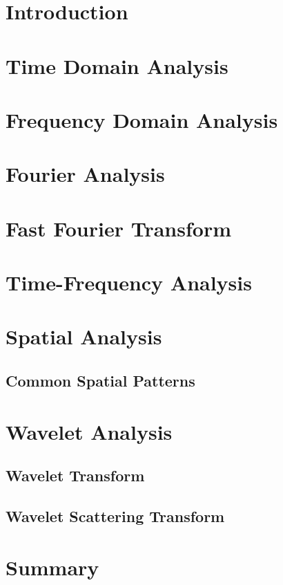 \section*{Introduction}

\section{Time Domain Analysis}

\section{Frequency Domain Analysis}

\section{Fourier Analysis}

\section{Fast Fourier Transform}

\section{Time-Frequency Analysis}

\section{Spatial Analysis}

\subsection{Common Spatial Patterns}

\section{Wavelet Analysis}

\subsection{Wavelet Transform}

\subsection{Wavelet Scattering Transform}

\section*{Summary}